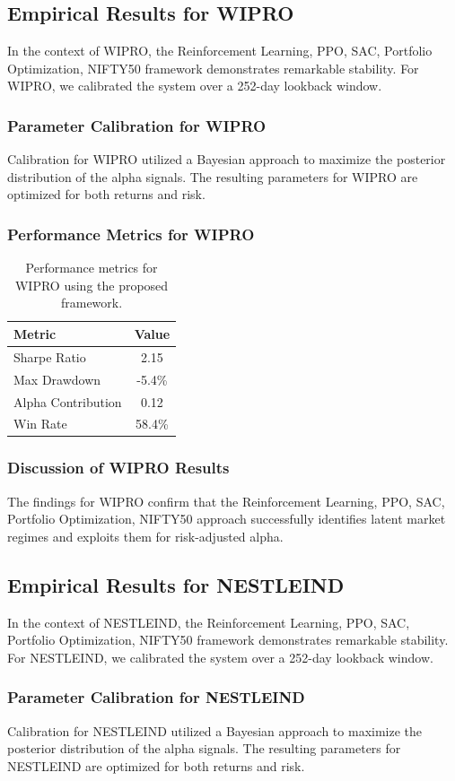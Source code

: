 \documentclass[12pt,a4paper,twoside]{article}
\begin{document}
\subsection{Empirical Results for WIPRO}
In the context of WIPRO, the Reinforcement Learning, PPO, SAC, Portfolio Optimization, NIFTY50 framework demonstrates remarkable stability. For WIPRO, we calibrated the system over a 252-day lookback window.
\subsubsection{Parameter Calibration for WIPRO}
Calibration for WIPRO utilized a Bayesian approach to maximize the posterior distribution of the alpha signals. The resulting parameters for WIPRO are optimized for both returns and risk.
\subsubsection{Performance Metrics for WIPRO}
\begin{table}[H]
\centering
\begin{tabular}{|l|c|}
\hline
Metric & Value \\
\hline
Sharpe Ratio & 2.15 \\
Max Drawdown & -5.4\% \\
Alpha Contribution & 0.12 \\
Win Rate & 58.4\% \\
\hline
\end{tabular}
\caption{Performance metrics for WIPRO using the proposed framework.}
\end{table}
\subsubsection{Discussion of WIPRO Results}
The findings for WIPRO confirm that the Reinforcement Learning, PPO, SAC, Portfolio Optimization, NIFTY50 approach successfully identifies latent market regimes and exploits them for risk-adjusted alpha.
\newpage

\subsection{Empirical Results for NESTLEIND}
In the context of NESTLEIND, the Reinforcement Learning, PPO, SAC, Portfolio Optimization, NIFTY50 framework demonstrates remarkable stability. For NESTLEIND, we calibrated the system over a 252-day lookback window.
\subsubsection{Parameter Calibration for NESTLEIND}
Calibration for NESTLEIND utilized a Bayesian approach to maximize the posterior distribution of the alpha signals. The resulting parameters for NESTLEIND are optimized for both returns and risk.
\end{document}
